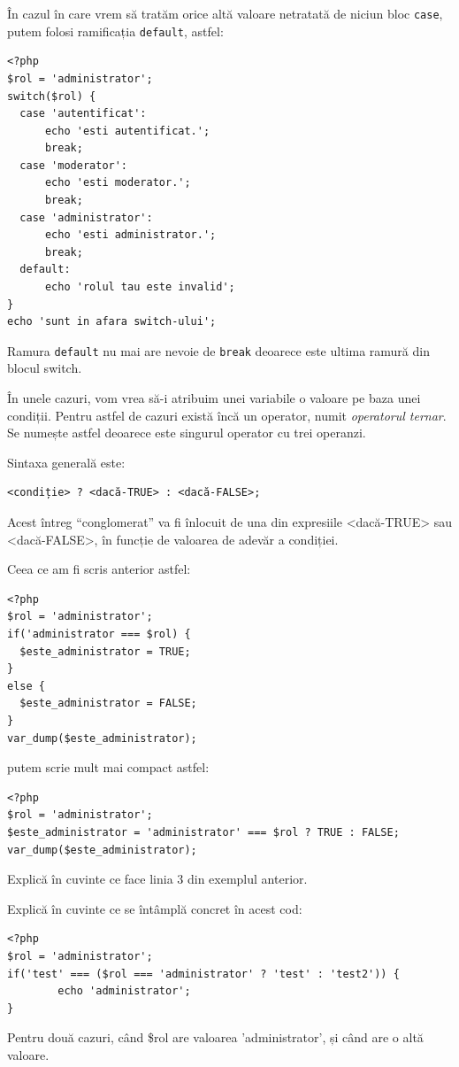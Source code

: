 În cazul în care vrem să tratăm orice altă
valoare netratată de niciun bloc \texttt{case}, putem
folosi ramificația \texttt{default}, astfel:

\begin{lstlisting}
<?php
$rol = 'administrator';
switch($rol) {
  case 'autentificat':
	  echo 'esti autentificat.';
	  break;
  case 'moderator':
	  echo 'esti moderator.';
	  break;
  case 'administrator':
	  echo 'esti administrator.';
	  break;
  default:
	  echo 'rolul tau este invalid';
}
echo 'sunt in afara switch-ului';
\end{lstlisting}
Ramura \texttt{default} nu mai are nevoie de \texttt{break} deoarece
este ultima ramură din blocul switch.


În unele cazuri, vom vrea să-i atribuim unei variabile o valoare
pe baza unei condiții. Pentru astfel de cazuri există încă un
operator, numit \textsl{operatorul ternar}. Se numește astfel deoarece
este singurul operator cu trei operanzi.

Sintaxa generală este:
\begin{verbatim}
<condiție> ? <dacă-TRUE> : <dacă-FALSE>;
\end{verbatim}
Acest întreg ``conglomerat'' va fi înlocuit de
una din expresiile <dacă-TRUE> sau <dacă-FALSE>,
în funcție de valoarea de adevăr a condiției.


Ceea ce am fi scris anterior astfel:
\begin{lstlisting}
<?php
$rol = 'administrator';
if('administrator === $rol) {
  $este_administrator = TRUE;
}
else {
  $este_administrator = FALSE;
}
var_dump($este_administrator);
\end{lstlisting}
putem scrie mult mai compact astfel:
\begin{lstlisting}
<?php
$rol = 'administrator';
$este_administrator = 'administrator' === $rol ? TRUE : FALSE;
var_dump($este_administrator);
\end{lstlisting}
\begin{Exercise}[title={Înțelegerea operatorului ternar},difficulty=2]
\ExePart
Explică în cuvinte ce face linia 3 din exemplul anterior.

\ExePart
Explică în cuvinte ce se întâmplă concret în acest cod:
\begin{lstlisting}
<?php
$rol = 'administrator';
if('test' === ($rol === 'administrator' ? 'test' : 'test2')) {
        echo 'administrator';
}
\end{lstlisting}
Pentru două cazuri, când \$rol are valoarea 'administrator', și când
are o altă valoare.
\end{Exercise}

